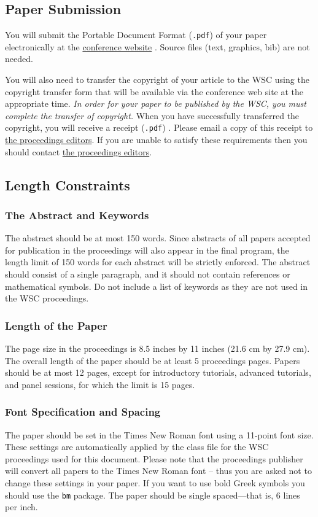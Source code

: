 \documentclass{wscpaperproc}
\theoremstyle{wsc}
\begin{document}
\subsection{Paper Submission}
You will submit the Portable Document Format ({\tt .pdf}) of your paper electronically at the \href{http://www.wintersim.org}{conference website} \cite{WSC}. Source files (text, graphics, bib) are not needed.

You will also need to transfer the copyright of your article to the WSC using the copyright transfer form that will be available via the conference web site at the appropriate time. {\em In order for your paper to be published by the WSC, you must complete the transfer of copyright.}
When you have successfully transferred the copyright, you will receive a receipt ({\tt .pdf}) .
Please email a copy of this receipt to \href{mailto://wsc17proceedings@gmail.com}{the proceedings editors}. If you are unable to satisfy these requirements then you should contact \href{mailto://wsc17proceedings@gmail.com}{the proceedings editors}.

\subsection{Length Constraints}

\subsubsection{The Abstract and Keywords}
The abstract should be at most 150 words. Since abstracts of all papers accepted for publication in the proceedings will also appear in the final program, the length limit of 150 words for each abstract will be strictly enforced. The abstract should consist of a single paragraph, and it should not contain references or mathematical symbols. Do not include a list of keywords as they are not used in the WSC proceedings.

\subsubsection{Length of the Paper}
The page size in the proceedings is 8.5 inches by 11 inches (21.6 cm by 27.9 cm). The overall length of the paper should be at least 5 proceedings pages. Papers should be at most 12 pages, except for introductory tutorials, advanced tutorials, and panel sessions, for which the limit is 15 pages.

\subsubsection{Font Specification and Spacing}
The paper should be set in the Times New Roman font using a 11-point font size.
These settings are automatically applied by the class file for the WSC proceedings used for this document.
Please note that the proceedings publisher will convert all papers to the Times New Roman font -- thus you are asked not to change these settings in your paper. If you want to use bold Greek symbols you should use the {\tt bm} package.
The paper should be single spaced---that is, 6 lines per inch.
\end{document}
